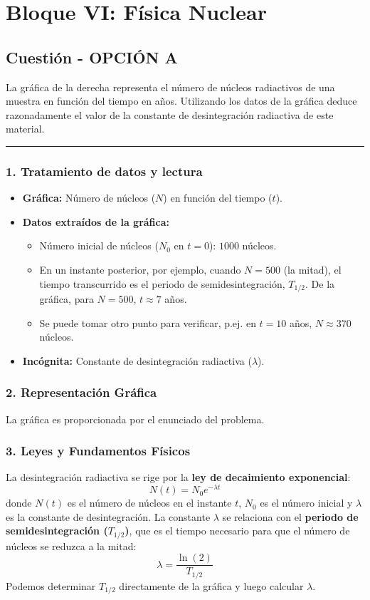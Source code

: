 \newpage
\section{Bloque VI: Física Nuclear}
\label{sec:nuclear_2012_sep}

\subsection{Cuestión - OPCIÓN A}
\label{subsec:VIA_2012_sep}

\begin{cajaenunciado}
La gráfica de la derecha representa el número de núcleos radiactivos de una muestra en función del tiempo en años. Utilizando los datos de la gráfica deduce razonadamente el valor de la constante de desintegración radiactiva de este material.
\end{cajaenunciado}
\hrule

\subsubsection*{1. Tratamiento de datos y lectura}
\begin{itemize}
    \item \textbf{Gráfica:} Número de núcleos ($N$) en función del tiempo ($t$).
    \item \textbf{Datos extraídos de la gráfica:}
        \begin{itemize}
            \item Número inicial de núcleos ($N_0$ en $t=0$): $1000$ núcleos.
            \item En un instante posterior, por ejemplo, cuando $N=500$ (la mitad), el tiempo transcurrido es el periodo de semidesintegración, $T_{1/2}$. De la gráfica, para $N=500$, $t \approx 7$ años.
            \item Se puede tomar otro punto para verificar, p.ej. en $t=10$ años, $N \approx 370$ núcleos.
        \end{itemize}
    \item \textbf{Incógnita:} Constante de desintegración radiactiva ($\lambda$).
\end{itemize}

\subsubsection*{2. Representación Gráfica}
La gráfica es proporcionada por el enunciado del problema.

\subsubsection*{3. Leyes y Fundamentos Físicos}
La desintegración radiactiva se rige por la \textbf{ley de decaimiento exponencial}:
$$ N(t) = N_0 e^{-\lambda t} $$
donde $N(t)$ es el número de núcleos en el instante $t$, $N_0$ es el número inicial y $\lambda$ es la constante de desintegración.
La constante $\lambda$ se relaciona con el \textbf{periodo de semidesintegración ($T_{1/2}$)}, que es el tiempo necesario para que el número de núcleos se reduzca a la mitad:
$$ \lambda = \frac{\ln(2)}{T_{1/2}} $$
Podemos determinar $T_{1/2}$ directamente de la gráfica y luego calcular $\lambda$.


